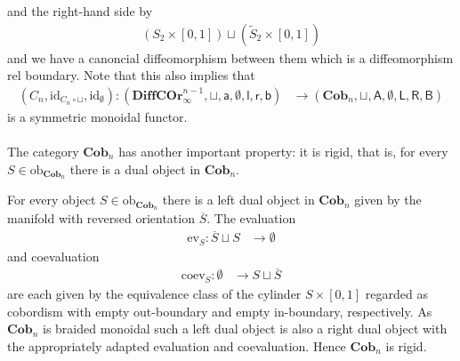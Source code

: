 and the right-hand side by
\begin{align*}
  (S_{2} \times [0,1])
  \sqcup
  (\tilde{S}_{2} \times [0,1])
\end{align*}
and we have a canoncial diffeomorphism between them which is a diffeomorphism rel boundary. Note that this also implies that
\begin{align*}
  \left(
    C_{n}
    ,
    \mathrm{id}_{C_{n} \circ \sqcup}
    ,
    \mathrm{id}_{\emptyset}
  \right)
  \colon
  \left(
    \mathbf{DiffCOr}_{\infty}^{n-1}
    ,
    \sqcup
    ,
    \mathsf{a}
    ,
    \emptyset
    ,
    \mathsf{l}
    ,
    \mathsf{r}
    ,
    \mathsf{b}
  \right)
  &\to
  \left(
    \mathbf{Cob}_{n}
    ,
    \sqcup
    ,
    \mathsf{A}
    ,
    \emptyset
    ,
    \mathsf{L}
    ,
    \mathsf{R}
    ,
    \mathsf{B}
  \right)
\end{align*}
is a symmetric monoidal functor.
\\\\
The category $\mathbf{Cob}_{n}$ has another important property: it is rigid, that is, for every $S \in \mathrm{ob}_{\mathbf{Cob}_{n}}$ there is a dual object in $\mathbf{Cob}_{n}$.
\\
\begin{lem}
\label{lem:cobrigid}
For every object $S \in \mathrm{ob}_{\mathbf{Cob}_{n}}$ there is a left dual object in $\mathbf{Cob}_{n}$ given by the manifold with reversed orientation $\overline{S}$. The evaluation
\begin{align*}
  \mathrm{ev}_{S}
  \colon
  \overline{S}
  \sqcup
  S
  &\to
  \emptyset
\end{align*}
and coevaluation
\begin{align*}
  \mathrm{coev}_{S}
  \colon
  \emptyset
  &\to
  S
  \sqcup
  \overline{S}
\end{align*}
are each given by the equivalence class of the cylinder $S \times [0,1]$ regarded as cobordism with empty out-boundary and empty in-boundary, respectively. As $\mathbf{Cob}_{n}$ is braided monoidal such a left dual object is also a right dual object with the appropriately adapted evaluation and coevaluation. Hence $\mathbf{Cob}_{n}$ is rigid.
\end{lem}

